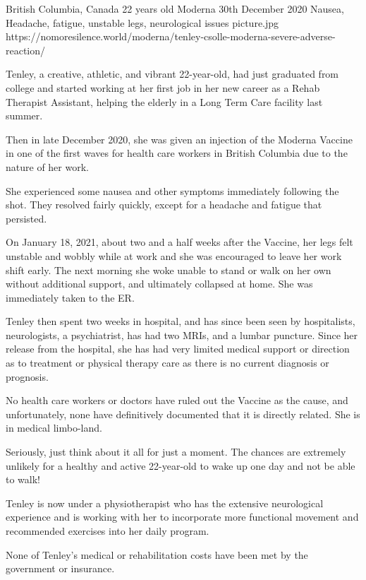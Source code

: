 {British Columbia, Canada}
{22 years old}
{Moderna}
{30th December 2020}
{Nausea, Headache, fatigue, unstable legs, neurological issues}
{picture.jpg}
{https://nomoresilence.world/moderna/tenley-csolle-moderna-severe-adverse-reaction/}
{

Tenley, a creative, athletic, and vibrant 22-year-old, had just graduated from
college and started working at her first job in her new career as a Rehab
Therapist Assistant, helping the elderly in a Long Term Care facility last
summer.

Then in late December 2020, she was given an injection of the Moderna Vaccine in
one of the first waves for health care workers in British Columbia due to the
nature of her work.

She experienced some nausea and other symptoms immediately following the
shot. They resolved fairly quickly, except for a headache and fatigue that
persisted.

On January 18, 2021, about two and a half weeks after the Vaccine, her legs felt
unstable and wobbly while at work and she was encouraged to leave her work shift
early. The next morning she woke unable to stand or walk on her own without
additional support, and ultimately collapsed at home. She was immediately taken
to the ER.

Tenley then spent two weeks in hospital, and has since been seen by
hospitalists, neurologists, a psychiatrist, has had two MRIs, and a lumbar
puncture. Since her release from the hospital, she has had very limited medical
support or direction as to treatment or physical therapy care as there is no
current diagnosis or prognosis.

No health care workers or doctors have ruled out the Vaccine as the cause, and
unfortunately, none have definitively documented that it is directly
related. She is in medical limbo-land.

Seriously, just think about it all for just a moment. The chances are extremely
unlikely for a healthy and active 22-year-old to wake up one day and not be able
to walk!

Tenley is now under a physiotherapist who has the extensive neurological
experience and is working with her to incorporate more functional movement and
recommended exercises into her daily program.

None of Tenley’s medical or rehabilitation costs have been met by the government
or insurance.

}
